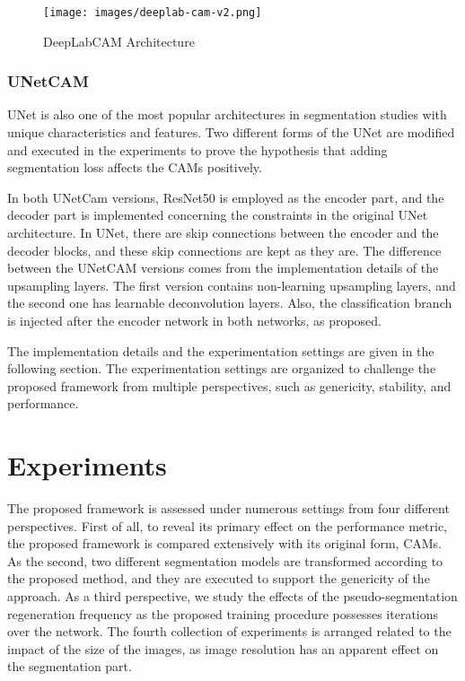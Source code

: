\documentclass[sn-mathphys]{sn-jnl}
\theoremstyle{thmstyleone}
\theoremstyle{thmstyletwo}\newtheorem{example}{Example}\newtheorem{remark}{Remark}
\theoremstyle{thmstylethree}\newtheorem{definition}{Definition}
\begin{document}
\begin{figure}[H]
    \centering
    \texttt{[image: images/deeplab-cam-v2.png]}
    \caption{DeepLabCAM Architecture}
    \label{deeplabcam_architecture}
\end{figure}


\subsubsection{UNetCAM}\label{unetcam_description}

UNet is also one of the most popular architectures in segmentation studies with unique characteristics and features. Two different forms of the UNet are modified and executed in the experiments to prove the hypothesis that adding segmentation loss affects the CAMs positively.

In both UNetCam versions, ResNet50 is employed as the encoder part, and the decoder part is implemented concerning the constraints in the original UNet architecture. In UNet, there are skip connections between the encoder and the decoder blocks, and these skip connections are kept as they are. The difference between the UNetCAM versions comes from the implementation details of the upsampling layers. The first version contains non-learning upsampling layers, and the second one has learnable deconvolution layers. Also, the classification branch is injected after the encoder network in both networks, as proposed.

The implementation details and the experimentation settings are given in the following section. The experimentation settings are organized to challenge the proposed framework from multiple perspectives, such as genericity, stability, and performance. 





\section{Experiments}\label{experiments}

The proposed framework is assessed under numerous settings from four different perspectives. First of all, to reveal its primary effect on the performance metric, the proposed framework is compared extensively with its original form, CAMs. As the second, two different segmentation models are transformed according to the proposed method, and they are executed to support the genericity of the approach. As a third perspective, we study the effects of the pseudo-segmentation regeneration frequency as the proposed training procedure possesses iterations over the network. The fourth collection of experiments is arranged related to the impact of the size of the images, as image resolution has an apparent effect on the segmentation part.
\end{document}
